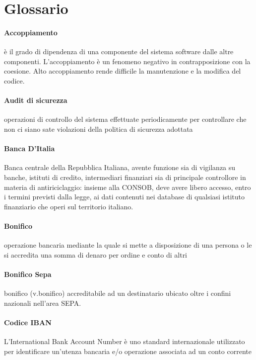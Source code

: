 \section{Glossario}

\paragraph{Accoppiamento}
\`e il grado di dipendenza di una componente del sistema software dalle altre componenti.
L'accoppiamento \`e un fenomeno negativo in contrapposizione con la coesione.
Alto accoppiamento rende difficile la manutenzione e la modifica del codice.

\paragraph{Audit di sicurezza} 
	operazioni di controllo del sistema effettuate periodicamente per controllare che non ci siano sate violazioni della politica di sicurezza adottata
\paragraph{Banca D'Italia}
	 Banca centrale della Repubblica Italiana, avente funzione sia di vigilanza su banche, istituti di credito, intermediari finanziari sia di principale controllore in materia di antiriciclaggio: insieme alla CONSOB, deve avere libero accesso, entro i termini previsti dalla legge, ai dati contenuti nei database di qualsiasi istituto finanziario che operi sul territorio italiano. \cite{banca_italia}
\paragraph{Bonifico}     
	operazione bancaria mediante la quale si mette a disposizione di una persona o le si accredita una somma di denaro per ordine e conto di altri
\paragraph{Bonifico Sepa}
	bonifico (v.bonifico) accreditabile ad un destinatario ubicato oltre i confini nazionali nell'area SEPA.
\paragraph{Codice IBAN}
	L'International Bank Account Number è uno standard internazionale utilizzato per identificare un'utenza bancaria e/o operazione associata ad un conto corrente 
